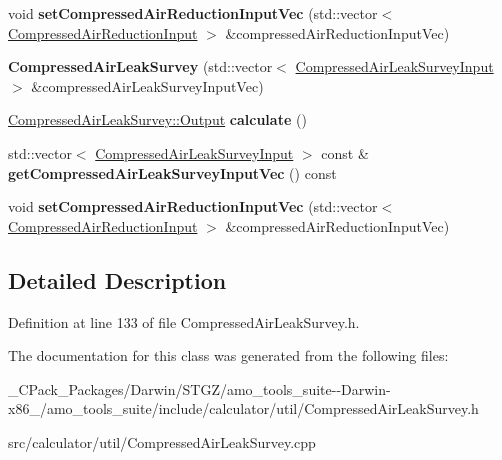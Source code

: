 \begin{DoxyCompactItemize}
\item 
\mbox{\label{class_compressed_air_leak_survey_a97fa87b2e5ac20e9c29ce5df271240db}} 
void {\bfseries set\+Compressed\+Air\+Reduction\+Input\+Vec} (std\+::vector$<$ \hyperlink{class_compressed_air_reduction_input}{Compressed\+Air\+Reduction\+Input} $>$ \&compressed\+Air\+Reduction\+Input\+Vec)
\item 
\mbox{\label{class_compressed_air_leak_survey_a29441242636eee3c8a857068153555be}} 
{\bfseries Compressed\+Air\+Leak\+Survey} (std\+::vector$<$ \hyperlink{class_compressed_air_leak_survey_input}{Compressed\+Air\+Leak\+Survey\+Input} $>$ \&compressed\+Air\+Leak\+Survey\+Input\+Vec)
\item 
\mbox{\label{class_compressed_air_leak_survey_a2115dcf2507ac17779f3e1e885e39263}} 
\hyperlink{struct_compressed_air_leak_survey_1_1_output}{Compressed\+Air\+Leak\+Survey\+::\+Output} {\bfseries calculate} ()
\item 
\mbox{\label{class_compressed_air_leak_survey_aa827f5971308799b61dad6390d561bd7}} 
std\+::vector$<$ \hyperlink{class_compressed_air_leak_survey_input}{Compressed\+Air\+Leak\+Survey\+Input} $>$ const  \& {\bfseries get\+Compressed\+Air\+Leak\+Survey\+Input\+Vec} () const
\item 
\mbox{\label{class_compressed_air_leak_survey_a97fa87b2e5ac20e9c29ce5df271240db}} 
void {\bfseries set\+Compressed\+Air\+Reduction\+Input\+Vec} (std\+::vector$<$ \hyperlink{class_compressed_air_reduction_input}{Compressed\+Air\+Reduction\+Input} $>$ \&compressed\+Air\+Reduction\+Input\+Vec)
\end{DoxyCompactItemize}


\subsection{Detailed Description}


Definition at line 133 of file Compressed\+Air\+Leak\+Survey.\+h.



The documentation for this class was generated from the following files\+:\begin{DoxyCompactItemize}
\item 
\+\_\+\+C\+Pack\+\_\+\+Packages/\+Darwin/\+S\+T\+G\+Z/amo\+\_\+tools\+\_\+suite-\/-\/\+Darwin-\/x86\+\_/amo\+\_\+tools\+\_\+suite/include/calculator/util/Compressed\+Air\+Leak\+Survey.\+h\item 
src/calculator/util/Compressed\+Air\+Leak\+Survey.\+cpp\end{DoxyCompactItemize}
